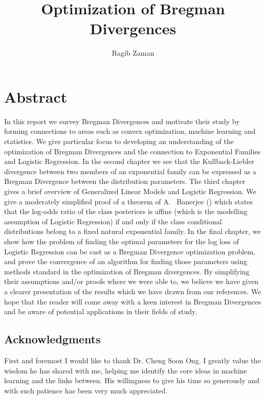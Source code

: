 \documentclass[BSc]{usydthesis}
\author{Ragib Zaman}
\title{Optimization of Bregman Divergences}
\numberwithin{equation}{chapter}
\theoremstyle{remark}
\begin{document}
  


\maketitle          %
\chapter*{Abstract}
In this report we survey Bregman Divergences and motivate their study by forming connections to areas such as convex optimization, machine learning and statistics. We give particular focus to developing an understanding of the optimization of Bregman Divergences and the connection to Exponential Families and Logistic Regression. In the second chapter we see that the Kullback-Liebler divergence between two members of an exponential family can be expressed as a Bregman Divergence between the distribution parameters. The third chapter gives a brief overview of Generalized Linear Models and Logistic Regression. We give a moderately simplified proof of a theorem of A.~ Banerjee (\cite{logodds}) which states that the log-odds ratio of the class posteriors is affine (which is the modelling assumption of Logistic Regression) if and only if the class conditional distributions belong to a fixed natural exponential family. In the final chapter, we show how the problem of finding the optimal parameters for the log loss of Logistic Regression can be cast as a Bregman Divergence optimization problem, and prove the convergence of an algorithm for finding those parameters using methods standard in the optimization of Bregman divergences. By simplifying their assumptions and/or proofs where we were able to, we believe we have given a clearer presentation of the results which we have drawn from our references. We hope that the reader will come away with a keen interest in Bregman Divergences and be aware of potential applications in their fields of study.\\ 
\section*{Acknowledgments}
First and foremost I would like to thank Dr. Cheng Soon Ong. I greatly value the wisdom he has shared with me, helping me identify the core ideas in machine learning and the links between. His willingness to give his time so generously and with such patience has been very much appreciated.\\
\end{document}
